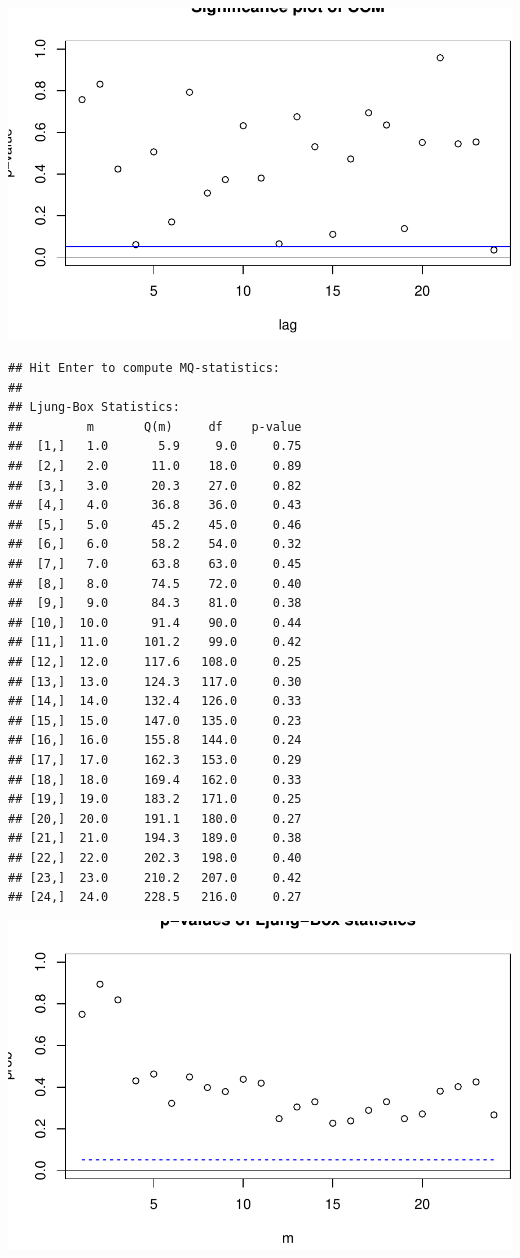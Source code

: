 \documentclass[]{article}
\begin{document}
\includegraphics{HW3_files/figure-latex/unnamed-chunk-6-2.pdf}

\begin{verbatim}
## Hit Enter to compute MQ-statistics: 
## 
## Ljung-Box Statistics:  
##         m       Q(m)     df    p-value
##  [1,]   1.0       5.9     9.0     0.75
##  [2,]   2.0      11.0    18.0     0.89
##  [3,]   3.0      20.3    27.0     0.82
##  [4,]   4.0      36.8    36.0     0.43
##  [5,]   5.0      45.2    45.0     0.46
##  [6,]   6.0      58.2    54.0     0.32
##  [7,]   7.0      63.8    63.0     0.45
##  [8,]   8.0      74.5    72.0     0.40
##  [9,]   9.0      84.3    81.0     0.38
## [10,]  10.0      91.4    90.0     0.44
## [11,]  11.0     101.2    99.0     0.42
## [12,]  12.0     117.6   108.0     0.25
## [13,]  13.0     124.3   117.0     0.30
## [14,]  14.0     132.4   126.0     0.33
## [15,]  15.0     147.0   135.0     0.23
## [16,]  16.0     155.8   144.0     0.24
## [17,]  17.0     162.3   153.0     0.29
## [18,]  18.0     169.4   162.0     0.33
## [19,]  19.0     183.2   171.0     0.25
## [20,]  20.0     191.1   180.0     0.27
## [21,]  21.0     194.3   189.0     0.38
## [22,]  22.0     202.3   198.0     0.40
## [23,]  23.0     210.2   207.0     0.42
## [24,]  24.0     228.5   216.0     0.27
\end{verbatim}

\includegraphics{HW3_files/figure-latex/unnamed-chunk-6-3.pdf}
\end{document}
